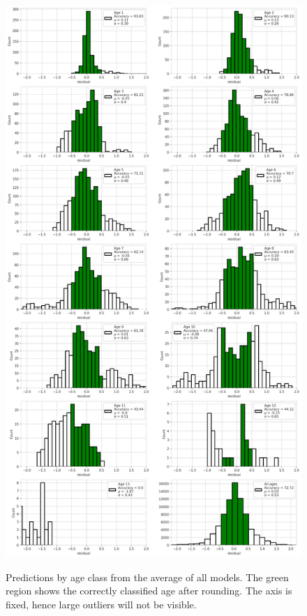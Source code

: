 \documentclass[10pt,letterpaper]{article}
\begin{document}
\begin{figure}[h!]
  \caption{Predictions by age class from the average of all models. The green region shows the correctly classified age after rounding. The axis is fixed, hence large outliers will not be visible.}
  \centering
  \includegraphics[scale=0.30]{results/eda/acc_by_age_dist_hist2.png}
  \label{marker6}
\end{figure}
\end{document}
